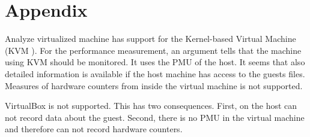 \appendix
\section{Appendix}

\begin{frame}{Analyze virtualized machine}
 has support for the Kernel-based Virtual Machine (KVM \cite{kvm}). For the performance measurement, an argument tells  that the machine using KVM should be monitored. It uses the PMU of the host. It seems that also detailed information is available if the host machine has access to the guests  files. Measures of hardware counters from inside the virtual machine is not supported.

VirtualBox \cite{virtualbox} is not supported. This has two consequences. First,  on the host can not record data about the guest. Second, there is no PMU in the virtual machine and therefore  can not record hardware counters.
\end{frame}

